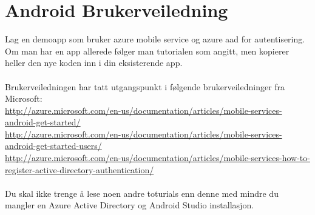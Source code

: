 \chapter{Android Brukerveiledning}
Lag en demoapp som bruker azure mobile service og azure aad for autentisering. Om man har en app allerede følger man tutorialen som angitt, men kopierer heller den nye koden inn i din eksisterende app. 
\\
\\
Brukerveiledningen har tatt utgangspunkt i følgende brukerveiledninger fra Microsoft:
\\\url{http://azure.microsoft.com/en-us/documentation/articles/mobile-services-android-get-started/}
\\\url{http://azure.microsoft.com/en-us/documentation/articles/mobile-services-android-get-started-users/}
\\\url{http://azure.microsoft.com/en-us/documentation/articles/mobile-services-how-to-register-active-directory-authentication/}
\\
\\
Du skal ikke trenge å lese noen andre toturials enn denne med mindre du mangler en Azure Active Directory og Android Studio installasjon.


